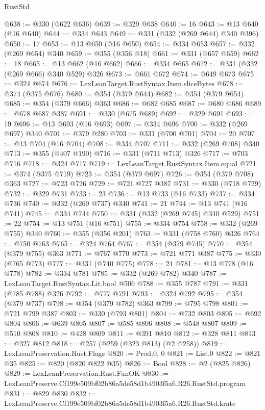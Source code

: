 \begin{lexlean}{RustStd}
\begin{coremodule}
@638 := @330 (@622 @636)
@639 := @329 @638
@640 := 16
@643 := @13 @640 (@16 @640)
@644 := @334 @643
@649 := @331 (@332 (@269 @644) @340 @396)
@650 := 17
@653 := @13 @650 (@16 @650)
@654 := @334 @653
@657 := @332 (@269 @654) @340
@659 := @355 (@356 @18)
@661 := @331 (@657 @659)
@662 := 18
@665 := @13 @662 (@16 @662)
@666 := @334 @665
@672 := @331 (@332 (@269 @666) @340 @529) @326
@673 := @661 @672
@674 := @649 @673
@675 := @324 @674
@676 := LexLeanTarget.RustSyntax.Item.sliceBytes
@678 := @374 (@375 @676)
@680 := @354 (@379 @644)
@682 := @354 (@379 @654)
@685 := @354 (@379 @666) @363
@686 := @682 @685
@687 := @680 @686
@689 := @678 @687 @387
@691 := @330 (@675 @689)
@692 := @329 @691
@693 := 19
@696 := @13 @693 (@16 @693)
@697 := @334 @696
@700 := @332 (@269 @697) @340
@701 := @379 @280
@703 := @331 (@700 @701)
@704 := 20
@707 := @13 @704 (@16 @704)
@708 := @334 @707
@711 := @332 (@269 @708) @340
@713 := @355 (@407 @190)
@716 := @331 (@711 @713) @326
@717 := @703 @716
@718 := @324 @717
@719 := LexLeanTarget.RustSyntax.Item.equal
@721 := @374 (@375 @719)
@723 := @354 (@379 @697)
@726 := @354 (@379 @708) @363
@727 := @723 @726
@729 := @721 @727 @387
@731 := @330 (@718 @729)
@732 := @329 @731
@733 := 23
@736 := @13 @733 (@16 @733)
@737 := @334 @736
@740 := @332 (@269 @737) @340
@741 := 21
@744 := @13 @741 (@16 @741)
@745 := @334 @744
@750 := @331 (@332 (@269 @745) @340 @529)
@751 := 22
@754 := @13 @751 (@16 @751)
@755 := @334 @754
@758 := @332 (@269 @755) @340
@760 := @355 (@356 @201)
@763 := @331 (@758 @760) @326
@764 := @750 @763
@765 := @324 @764
@767 := @354 (@379 @745)
@770 := @354 (@379 @755) @363
@771 := @767 @770
@773 := @721 @771 @387
@775 := @330 (@765 @773)
@777 := @331 (@740 @775)
@778 := 24
@781 := @13 @778 (@16 @778)
@782 := @334 @781
@785 := @332 (@269 @782) @340
@787 := LexLeanTarget.RustSyntax.Lit.bool @506
@788 := @355 @787
@791 := @331 (@785 @788) @326
@792 := @777 @791
@793 := @324 @792
@795 := @354 (@379 @737)
@798 := @354 (@379 @782) @363
@799 := @795 @798
@801 := @721 @799 @387
@803 := @330 (@793 @801)
@804 := @732 @803
@805 := @692 @804
@806 := @639 @805
@807 := @585 @806
@808 := @548 @807
@809 := @510 @808
@810 := @428 @809
@811 := @391 @810
@812 := @328 @811
@813 := @327 @812
@818 := @257 (@259 (@323 @813) (@2 @258))
@819 := LexLeanPreservation.Rust.Flags
@820 := Prod.{0, 0}
@821 := List.{0}
@822 := @821 @35
@825 := @820 (@820 @822 @35)
@826 := Bool
@828 := @2 (@825 @826)
@829 := LexLeanPreservation.Rust.FunOK
@830 := LexLeanPreserve.Cf199e509bf02b86a5de58d1b4903f5a6.R26.RustStd.program
@831 := @829 @830
@832 := LexLeanPreserve.Cf199e509bf02b86a5de58d1b4903f5a6.R26.RustStd.krate

\end{coremodule}
\end{lexlean}
